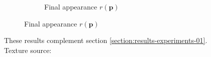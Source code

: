 \begin{figure}[]
\begin{subfigure}{\textwidth}
\begin{subfigure}{0.24\textwidth}
            \caption*{Final appearance \(r(\bm{p})\)}
        \end{subfigure}
    \end{subfigure}
    \caption{These results complement section \ref{section:results-experiments-01}. Texture source: \citet{Pixar128}}
    \label{fig:ex01-complete-flowers-1000steps}
\end{figure}

